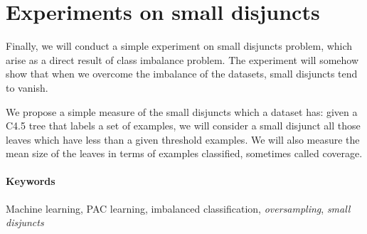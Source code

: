 \section*{Experiments on small disjuncts}
Finally, we will conduct a simple experiment on small disjuncts problem, which arise as a direct result of class imbalance
problem. The experiment will somehow show that when we overcome the imbalance of the datasets, small disjuncts tend to
vanish.

We propose a simple measure of the small disjuncts which a dataset has: given a C4.5 tree that labels a set of examples, we 
will consider a small disjunct all those leaves which have less than a given threshold examples. We will also measure the
mean size of the leaves in terms of examples classified, sometimes called coverage.

\paragraph{Keywords}
Machine learning, PAC learning, imbalanced classification, \textit{oversampling}, \textit{small disjuncts}